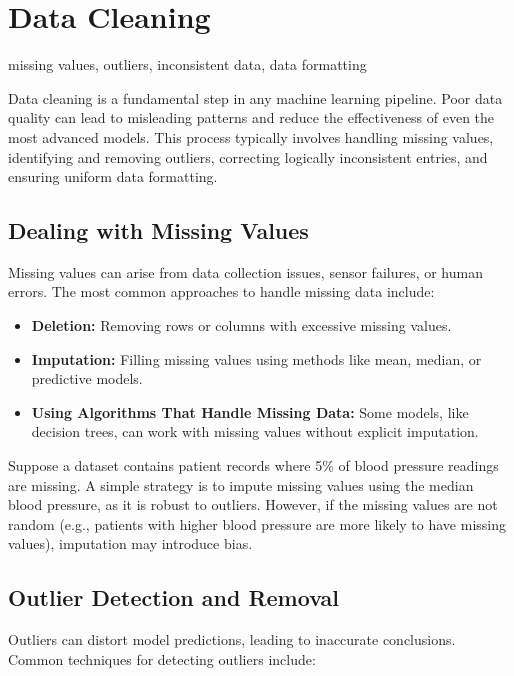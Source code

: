 \documentclass[12pt,openany]{book}
\begin{document}
\section{Data Cleaning}

\begin{keywordsbox}
missing values, outliers, inconsistent data, data formatting
\end{keywordsbox}

Data cleaning is a fundamental step in any machine learning pipeline. Poor data quality can lead to misleading patterns and reduce the effectiveness of even the most advanced models. This process typically involves handling missing values, identifying and removing outliers, correcting logically inconsistent entries, and ensuring uniform data formatting. \newline

\subsection{Dealing with Missing Values}
Missing values can arise from data collection issues, sensor failures, or human errors. The most common approaches to handle missing data include:

\begin{itemize}
    \item \textbf{Deletion:} Removing rows or columns with excessive missing values.
    \item \textbf{Imputation:} Filling missing values using methods like mean, median, or predictive models.
    \item \textbf{Using Algorithms That Handle Missing Data:} Some models, like decision trees, can work with missing values without explicit imputation.
\end{itemize}

\begin{examplebox}
Suppose a dataset contains patient records where 5\% of blood pressure readings are missing. A simple strategy is to impute missing values using the median blood pressure, as it is robust to outliers. However, if the missing values are not random (e.g., patients with higher blood pressure are more likely to have missing values), imputation may introduce bias.
\end{examplebox}

\subsection{Outlier Detection and Removal}
Outliers can distort model predictions, leading to inaccurate conclusions. Common techniques for detecting outliers include:
\end{document}
